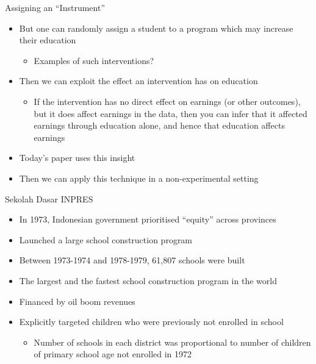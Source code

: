 \documentclass[11pt,notes=hide,aspectratio=169,mathserif]{beamer}
\begin{document}
\begin{frame}{Assigning an ``Instrument''}
\begin{itemize}
\item But one can randomly assign a student to a program which may increase their education 
\begin{itemize}
     \item  Examples of such interventions? 
\end{itemize}
 \item  Then we can exploit the effect an intervention has on education 
\begin{itemize}
     \item  If the intervention has no direct effect on earnings (or other outcomes), but it does affect earnings in the data, then you can infer that it affected earnings through education alone, and hence that education affects earnings 
\end{itemize}
 \item  Today's paper uses this insight 
 \item  Then we can apply this technique in a non-experimental setting
\end{itemize}
\end{frame}

\begin{frame}{Sekolah Dasar INPRES}
\begin{itemize}
\item In 1973, Indonesian government prioritised ``equity'' across provinces
 \item Launched a large school construction program
 \item Between 1973-1974 and 1978-1979, 61,807 schools were built
 \item The largest and the fastest school construction program in the world
 \item Financed by oil boom revenues
 \item Explicitly targeted children who were previously not enrolled in school 
    \begin{itemize}
         \item Number of schools in each district was proportional to number of children of primary school age not enrolled in 1972
    \end{itemize}
\end{itemize}
\end{frame}
\end{document}
